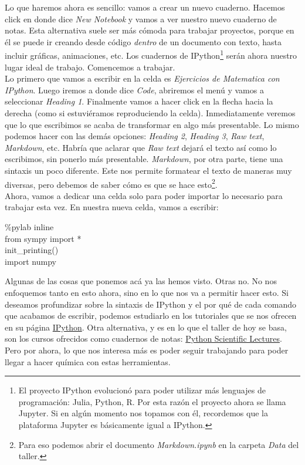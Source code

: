 \documentclass[10pt,letterpaper]{article}
\newenvironment{Code}
{
\begin{lrbox}{\selvestebox}%
\begin{minipage}{\dimexpr\columnwidth-2\fboxsep\relax}
\fontfamily{\ttdefault}\selectfont
}
{\end{minipage}\end{lrbox}%
\begin{center}
\colorbox{light-gray}{\usebox{\selvestebox}}
\end{center}
}
\begin{document}
Lo que haremos ahora es sencillo: vamos a crear un nuevo cuaderno. Hacemos click en donde dice \textit{New Notebook} y vamos a ver nuestro nuevo cuaderno de notas. Esta alternativa suele ser m\'as c\'omoda para trabajar proyectos, porque en \'el se puede ir creando desde c\'odigo \emph{dentro} de un documento con texto, hasta incluir gr\'aficas, animaciones, etc. Los cuadernos de IPython\footnote{El proyecto IPython evolucion\'o para poder utilizar m\'as lenguajes de programaci\'on: Julia, Python, R. Por esta raz\'on el proyecto ahora se llama Jupyter. Si en alg\'un momento nos topamos con \'el, recordemos que la plataforma Jupyter es b\'asicamente igual a IPython.} ser\'an ahora nuestro lugar ideal de trabajo. Comencemos a trabajar.\\

Lo primero que vamos a escribir en la celda es \emph{Ejercicios de Matematica con IPython}. Luego iremos a donde dice \textit{Code}, abriremos el men\'u y vamos a seleccionar \textit{Heading 1}. Finalmente vamos a hacer click en la flecha hacia la derecha (como si estuvi\'eramos reproduciendo la celda). Inmediatamente veremos que lo que escribimos se acaba de transformar en algo m\'as presentable. Lo mismo podemos hacer con las dem\'as opciones: \textit{Heading 2}, \textit{Heading 3}, \textit{Raw text}, \textit{Markdown}, etc. Habr\'ia que aclarar que \textit{Raw text} dejar\'a el texto as\'i como lo escribimos, sin ponerlo m\'as presentable. \textit{Markdown}, por otra parte, tiene una sintaxis un poco diferente. Este nos permite formatear el texto de maneras muy diversas, pero debemos de saber c\'omo es que se hace esto\footnote{Para eso podemos abrir el documento \textit{Markdown.ipynb} en la carpeta \textit{Data} del taller.}.\\

Ahora, vamos a dedicar una celda solo para poder importar lo necesario para trabajar esta vez. En nuestra nueva celda, vamos a escribir:

\begin{Code}
\%pylab inline\\
from sympy import *\\
init\_printing()\\
import numpy
\end{Code}

Algunas de las cosas que ponemos ac\'a ya las hemos visto. Otras no. No nos enfoquemos tanto en esto ahora, sino en lo que nos va a permitir hacer esto. Si deseamos profundizar sobre la sintaxis de IPython y el por qu\'e de cada comando que acabamos de escribir, podemos estudiarlo en los tutoriales que se nos ofrecen en su p\'agina \href{http://ipython.org/}{IPython}. Otra alternativa, y es en lo que el taller de hoy se basa, son los cursos ofrecidos como cuadernos de notas: \href{https://github.com/jrjohansson/scientific-python-lectures}{Python Scientific Lectures}. Pero por ahora, lo que nos interesa m\'as es poder seguir trabajando para poder llegar a hacer qu\'imica con estas herramientas.\\
\end{document}

